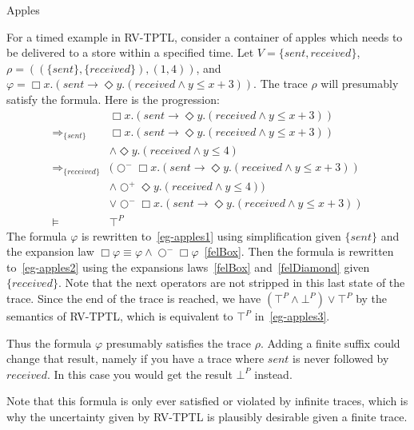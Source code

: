 \documentclass[a4paper]{article}
\newcommand{\sn}{\bigcirc^+}
\newcommand{\wn}{\bigcirc^-}
\newcommand{\rw}[1]{\Rightarrow_{#1}}
\begin{document}
\begin{eg}{Apples}

  For a timed example in RV-TPTL, consider a container of apples which needs to be delivered to a store within a specified time. Let $V=\{sent, received\}$, \(\rho=((\{sent\},\{received\}),(1,4))\), and \(\varphi=\Box x. (sent \to \Diamond y. (received \land y \leq x + 3))\).
  The trace $\rho$ will presumably satisfy the formula.
  Here is the progression:
  \begin{align}
    &\Box x. (sent \to \Diamond y. (received \land y \leq x + 3))\nonumber\\
    \rw{\{sent\}}
    &\Box x. (sent \to \Diamond y. (received \land y \leq x + 3))\nonumber\\
    &\land \Diamond y. (received \land y \leq 4)
    \label{eg-apples1}\\
    \rw{\{received\}}
    &(\wn \Box x. (sent \to \Diamond y. (received \land y \leq x + 3))\nonumber\\
    &\land \sn \Diamond y. (received \land y \leq 4))\nonumber\\
    &\lor \wn \Box x. (sent \to \Diamond y. (received \land y \leq x + 3))\label{eg-apples2}\\
    \vDash
    &\top^P\label{eg-apples3}
  \end{align}
  The formula $\varphi$ is rewritten to~\eqref{eg-apples1} using simplification given $\{sent\}$ and the expansion law $\Box \varphi \equiv \varphi \land \wn \Box \varphi$~\eqref{felBox}.
  Then the formula is rewritten to~\eqref{eg-apples2} using the expansions laws~\eqref{felBox} and~\eqref{felDiamond} given $\{received\}$.
  Note that the next operators are not stripped in this last state of the trace.
  Since the end of the trace is reached, we have $(\top^P \land \bot^P) \lor \top^P$ by the semantics of RV-TPTL, which is equivalent to $\top^P$ in~\eqref{eg-apples3}.

  Thus the formula $\varphi$ presumably satisfies the trace $\rho$.
  Adding a finite suffix could change that result, namely if you have a trace where $sent$ is never followed by $received$.
  In this case you would get the result $\bot^P$ instead.

  Note that this formula is only ever satisfied or violated by infinite traces, which is why the uncertainty given by RV-TPTL is plausibly desirable given a finite trace.
\end{eg}

\end{document}

